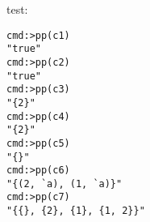 \documentclass{../lib}
\begin{document}
\begin{ledDef}
\end{ledDef}

\begin{ledDef}
\end{ledDef}

\begin{ledDef}
\end{ledDef}

\begin{ledDef}
\end{ledDef}

\begin{ledDef}
\end{ledDef}

\begin{ledDef}
\end{ledDef}

\begin{ledDef}
\end{ledDef}

\begin{ledCmnt}
test:
\begin{verbatim}
cmd:>pp(c1)
"true"
cmd:>pp(c2)
"true"
cmd:>pp(c3)
"{2}"
cmd:>pp(c4)
"{2}"
cmd:>pp(c5)
"{}"
cmd:>pp(c6)
"{(2, `a), (1, `a)}"
cmd:>pp(c7)
"{{}, {2}, {1}, {1, 2}}"
\end{verbatim}
\end{ledCmnt}
\end{document}

